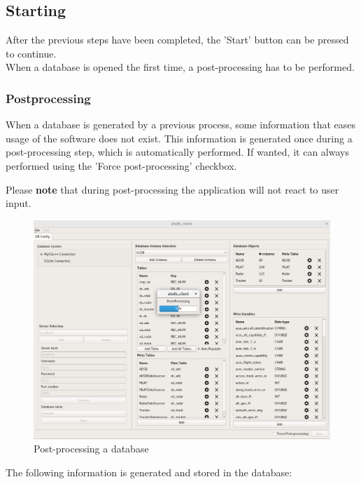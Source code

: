 \documentclass[10pt,letterpaper,extrafontsizes]{memoir}
\begin{document}
\subsection{Starting}

After the previous steps have been completed, the 'Start' button can be pressed to continue. \\

When a database is opened the first time, a post-processing has to be performed.

\subsubsection{Postprocessing}
When a database is generated by a previous process,  some information that eases usage of the software does not exist. This information is generated once during a post-processing step, which is automatically performed. If wanted, it can always performed using the 'Force post-processing' checkbox.

Please \textbf{note} that during post-processing the application will not react to user input. \\


\begin{figure}[H]
  \hspace*{-2cm}
    \includegraphics[width=18cm]{../screenshots/db_postprocessing.png}
  \caption{Post-processing a database}
  \label{fig:db_postprocessing}
\end{figure}

The following information is generated and stored in the database:
\end{document}
